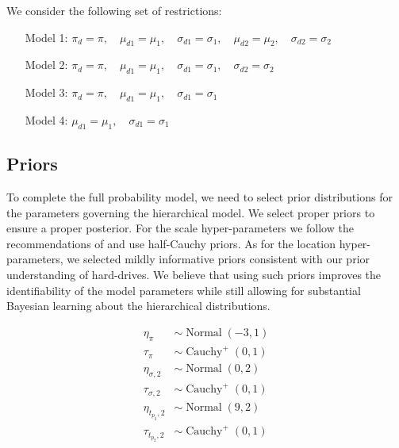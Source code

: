\documentclass{article}
\newcommand{\op}{\operatorname}
\begin{document}
We consider the following set of restrictions:

\begin{enumerate}
\item[Model 1:] $\pi_{d} = \pi,\quad \mu_{d1} = \mu_1,\quad \sigma_{d1}=\sigma_1,\quad \mu_{d2} = \mu_2,\quad \sigma_{d2} = \sigma_2$
\item[Model 2:] $\pi_{d} = \pi,\quad \mu_{d1} = \mu_1,\quad \sigma_{d1}=\sigma_1,\quad \sigma_{d2} = \sigma_2$
\item[Model 3:] $\pi_{d} = \pi,\quad \mu_{d1} = \mu_1,\quad \sigma_{d1}=\sigma_1$
\item[Model 4:] $\mu_{d1} = \mu_1,\quad \sigma_{d1}=\sigma_1$
\end{enumerate}

\subsection{Priors}
To complete the full probability model, we need to select prior distributions for the parameters governing the hierarchical model. We select proper priors to ensure a proper posterior. For the scale hyper-parameters we follow the recommendations of \citet{gelman2014bayesian} and use half-Cauchy priors. As for the location hyper-parameters, we selected mildly informative priors consistent with our prior understanding of hard-drives. We believe that using such priors improves the identifiability of the model parameters while still allowing for substantial Bayesian learning about the hierarchical distributions.

\begin{align*}
  \eta_{\pi} & \sim \op{Normal}(-3, 1)\\
  \tau_{\pi} & \sim \op{Cauchy}^+(0, 1)\\
  \eta_{\sigma ,2} & \sim \op{Normal}(0, 2)\\
  \tau_{\sigma ,2} & \sim \op{Cauchy}^+(0, 1)\\
  \eta_{t_{p_2},2} & \sim \op{Normal}(9, 2)\\
  \tau_{t_{p_2},2} & \sim \op{Cauchy}^+(0, 1)
 \end{align*} 
 
 
 
\end{document}
